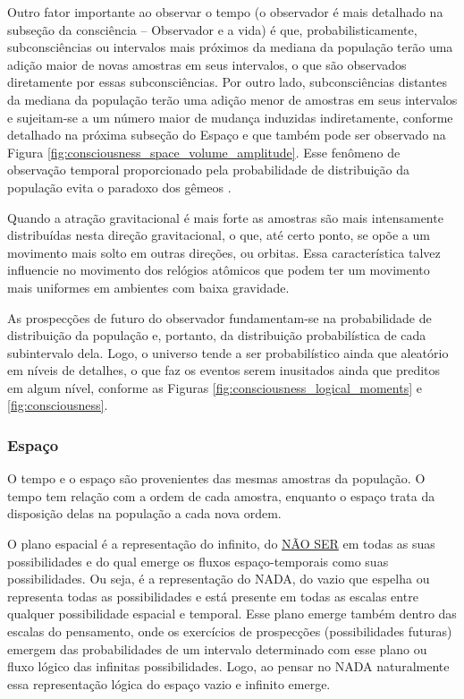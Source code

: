 Outro fator importante ao observar o tempo (o observador é mais detalhado na subseção da consciência – Observador e a vida) é que, probabilisticamente, subconsciências ou intervalos mais próximos da mediana da população terão uma adição maior de novas amostras em seus intervalos, o que são observados diretamente por essas subconsciências. Por outro lado, subconsciências distantes da mediana da população terão uma adição menor de amostras em seus intervalos e sujeitam-se a um número maior de mudança induzidas indiretamente, conforme detalhado na próxima subseção do Espaço e que também pode ser observado na Figura \ref{fig:consciousness_space_volume_amplitude}. Esse fenômeno de observação temporal proporcionado pela probabilidade de distribuição da população evita o paradoxo dos gêmeos \cite{brasilescola_paradoxo_gemeos}.

Quando a atração gravitacional é mais forte as amostras são mais intensamente distribuídas nesta direção gravitacional, o que, até certo ponto, se opõe a um movimento mais solto em outras direções, ou orbitas. Essa característica talvez influencie no movimento dos relógios atômicos que podem ter um movimento mais uniformes em ambientes com baixa gravidade.

As prospecções de futuro do observador fundamentam-se na probabilidade de distribuição da população e, portanto, da distribuição probabilística de cada subintervalo dela. Logo, o universo tende a ser probabilístico ainda que aleatório em níveis de detalhes, o que faz os eventos serem inusitados ainda que preditos em algum nível, conforme as Figuras \ref{fig:consciousness_logical_moments} e \ref{fig:consciousness}. 

\subsubsection{Espaço}
O tempo e o espaço são provenientes das mesmas amostras da população. O tempo tem relação com a ordem de cada amostra, enquanto o espaço trata da disposição delas na população a cada nova ordem. 

O plano espacial é a representação do infinito, do \underline{NÃO SER} em todas as suas possibilidades e do qual emerge os fluxos espaço-temporais como suas possibilidades. Ou seja, é a representação do NADA, do vazio que espelha ou representa todas as possibilidades e está presente em todas as escalas entre qualquer possibilidade espacial e temporal. Esse plano emerge também dentro das escalas do pensamento, onde os exercícios de prospecções (possibilidades futuras) emergem das probabilidades de um intervalo determinado com esse plano ou fluxo lógico das infinitas possibilidades. Logo, ao pensar no NADA naturalmente essa representação lógica do espaço vazio e infinito emerge.

